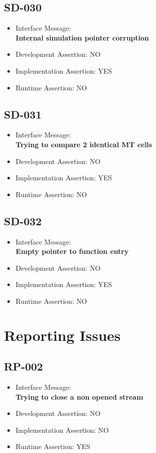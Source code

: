 \subsection{SD-030}
\begin{itemize}
  \item Interface Message:\\[1em]\textbf{Internal simulation pointer corruption}
  \item Development Assertion: NO
  \item Implementation Assertion: YES
  \item Runtime Assertion: NO
\end{itemize}

\subsection{SD-031}
\begin{itemize}
  \item Interface Message:\\[1em]\textbf{Trying to compare 2 identical MT cells}
  \item Development Assertion: NO
  \item Implementation Assertion: YES
  \item Runtime Assertion: NO
\end{itemize}

\subsection{SD-032}
\begin{itemize}
  \item Interface Message:\\[1em]\textbf{Empty pointer to function entry}
  \item Development Assertion: NO
  \item Implementation Assertion: YES
  \item Runtime Assertion: NO
\end{itemize}

\section{Reporting Issues}

\subsection{RP-002}
\begin{itemize}
  \item Interface Message:\\[1em]\textbf{Trying to close a non opened stream}
  \item Development Assertion: NO
  \item Implementation Assertion: NO
  \item Runtime Assertion: YES
\end{itemize}

